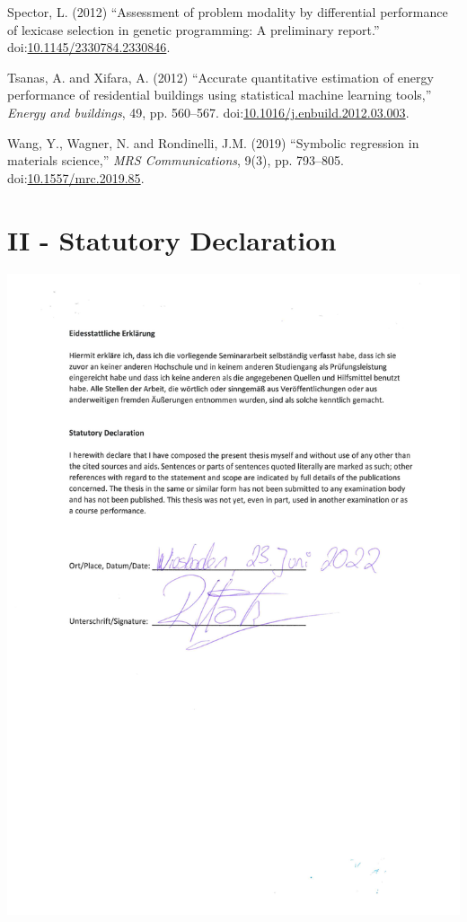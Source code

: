 \documentclass[
  12pt,
]{article}
\newlength{\cslhangindent}
\newlength{\cslentryspacingunit} %
\newenvironment{CSLReferences}[2] %
 {%
  \setlength{\parindent}{0pt}
  \ifodd #1
  \let\oldpar\par
  \def\par{\hangindent=\cslhangindent\oldpar}
  \fi
  \setlength{\parskip}{#2\cslentryspacingunit}
 }%
 {}
\begin{document}
\begin{CSLReferences}{0}{0}
\leavevmode{}%
Spector, L. (2012) {``Assessment of problem modality by differential
performance of lexicase selection in genetic programming: A preliminary
report.''}
doi:\href{https://doi.org/10.1145/2330784.2330846}{10.1145/2330784.2330846}.

\leavevmode{}%
Tsanas, A. and Xifara, A. (2012) {``Accurate quantitative estimation of
energy performance of residential buildings using statistical machine
learning tools,''} \emph{Energy and buildings}, 49, pp. 560--567.
doi:\href{https://doi.org/10.1016/j.enbuild.2012.03.003}{10.1016/j.enbuild.2012.03.003}.

\leavevmode{}%
Wang, Y., Wagner, N. and Rondinelli, J.M. (2019) {``Symbolic regression
in materials science,''} \emph{MRS Communications}, 9(3), pp. 793--805.
doi:\href{https://doi.org/10.1557/mrc.2019.85}{10.1557/mrc.2019.85}.

\end{CSLReferences}

\hypertarget{II}{%
\section*{II - Statutory Declaration}\label{II}}

\includegraphics{./private/erklaerung.pdf}\\
\end{document}
